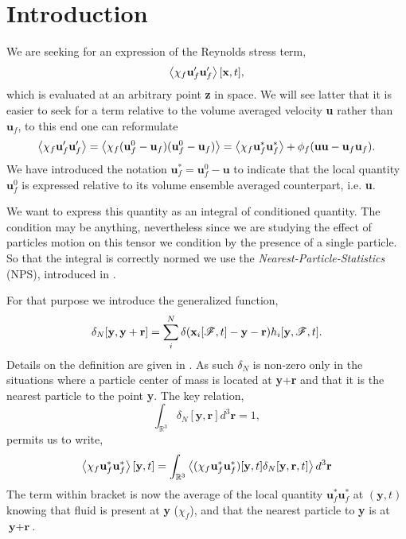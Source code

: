 \section{Introduction}


We are seeking for an expression of the Reynolds stress term,
\begin{equation}
    \left<\chi_f \textbf{u}'_f\textbf{u}_f'\right>[\textbf{x},t],
\end{equation}
which is evaluated at an arbitrary point \textbf{z} in space. 
We will see latter that it is easier to seek for a term relative to the volume averaged velocity \textbf{u} rather than $\textbf{u}_f$, to this end one can reformulate 
\begin{equation*}
    \left<\chi_f \textbf{u}_f'\textbf{u}_f'\right>
    = \left<\chi_f (\textbf{u}^0_f-\textbf{u}_f)(\textbf{u}^0_f-\textbf{u}_f)\right>
    = 
    \left<\chi_f \textbf{u}^*_f\textbf{u}^*_f\right>
    + \phi_f (\textbf{uu} - \textbf{u}_f \textbf{u}_f ). 
\end{equation*}
We have introduced the notation $\textbf{u}_f^*= \textbf{u}_f^0 - \textbf{u}$ to indicate that the local quantity $\textbf{u}_f^0$ is expressed relative to its  volume ensemble averaged counterpart, i.e. \textbf{u}.

We want to express this quantity as an integral of conditioned quantity. 
The condition may be anything, nevertheless since we are studying the effect of particles motion on this tensor we condition by the presence of a single particle. 
So that the integral is correctly normed we use the \textit{Nearest-Particle-Statistics} (NPS), introduced in \citep{zhang2021ensemble}.

For that purpose we introduce the generalized function, 
\begin{equation}
    \delta_N[\textbf{y},\textbf{y}+\textbf{r}]
    =  \sum_i^N \delta(\textbf{x}_i[\mathscr{F},t] - \textbf{y}- \textbf{r})h_i[\textbf{y},\mathscr{F},t].
\end{equation}
Details on the definition are given in \citet{zhang2021ensemble,fintzi2025}. 
As such $\delta_N$ is non-zero only in the situations where a particle center of mass is located at \textbf{y}+\textbf{r} and that it is the nearest particle to the point \textbf{y}. 
The key relation, 
\begin{equation}
    \int_{\mathbb{R}^3} \delta_N[\textbf{y},\textbf{r}] d^3 \textbf{r} = 1, 
\end{equation}
permits us to write, 
\begin{equation}
    \left<\chi_f \textbf{u}^*_f\textbf{u}^*_f\right>[\textbf{y},t]
    =
    \int_{\mathbb{R}^3}
    \left<(\chi_f \textbf{u}^*_f\textbf{u}^*_f) [\textbf{y},t] \delta_N [\textbf{y},\textbf{r},t]\right>
    d^3 \textbf{r}
\end{equation}
The term within bracket is now the average of the local quantity $\textbf{u}^*_f\textbf{u}^*_f$ at $(\textbf{y},t)$ knowing that fluid is present at \textbf{y} ($\chi_f$), and that the nearest particle to \textbf{y} is at $\textbf{y}+ \textbf{r}$. 


